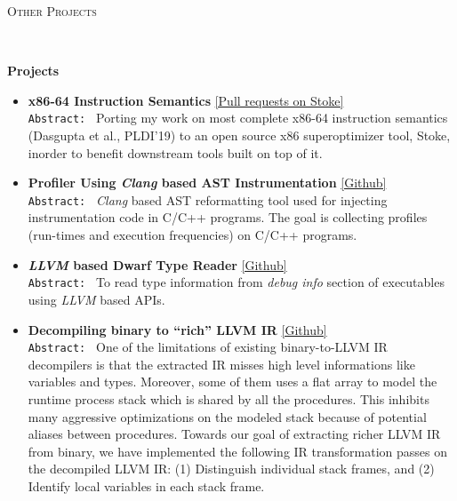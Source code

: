 \documentclass[9pt]{article}
\newenvironment{changemargin}[2]{%
  \begin{list}{}{%
    \setlength{\topsep}{0pt}%
    \setlength{\leftmargin}{#1}%
    \setlength{\rightmargin}{#2}%
    \setlength{\listparindent}{\parindent}%
    \setlength{\itemindent}{\parindent}%
    \setlength{\parsep}{\parskip}%
  }%
  \item[]}{\end{list}
}
\newcommand{\lineover}{
	\begin{changemargin}{-0.05in}{-0.05in}
		\vspace*{-8pt}
		\hrulefill \\
		\vspace*{-2pt}
	\end{changemargin}
}
\newcommand{\header}[1]{
	\begin{changemargin}{-0.5in}{-0.5in}
		\scshape{#1}\\
  	\lineover
	\end{changemargin}
}
\newenvironment{body} {
	\vspace*{-16pt}
	\begin{changemargin}{-0.25in}{-0.5in}
  }	
	{\end{changemargin}
}
\begin{document}
\smallskip

\header{Other Projects}

\begin{body}
	\vspace{14pt}
	\textbf{Projects}{} \hfill  \\
	\begin{itemize} \itemsep 3pt

           \item \textbf{x86-64 Instruction Semantics}
           \href{https://github.com/StanfordPL/stoke/pulls?q=is%3Apr+author%3Asdasgup3+is%3Aclosed}{[Pull requests on Stoke]} \\ 
           \texttt{Abstract: } Porting my work on most complete x86-64 instruction semantics (Dasgupta et al., PLDI'19) to an
open source x86 superoptimizer tool, Stoke, inorder to benefit downstream tools built on top of it.


           \item \textbf{Profiler Using \emph{Clang} based AST Instrumentation}
           \href{https://github.com/sdasgup3/profiler-using-clang-based-ast-instrumentation}{[Github]} \\ 
           \texttt{Abstract: } \emph{Clang} based AST reformatting tool used for
           injecting instrumentation code in C/C++ programs. The goal is
           collecting profiles (run-times and execution frequencies) on C/C++
           programs.

           \item \textbf{\emph{LLVM} based Dwarf Type Reader} 
           \href{https://github.com/sdasgup3/dwarf-type-reader}{[Github]} \\
             \texttt{Abstract: } To read type information from \emph{debug info}
             section of executables using \emph{LLVM} based APIs.

           \item \textbf{Decompiling binary to ``rich'' LLVM IR}
           \href{https://github.com/sdasgup3/binary-decompilation/blob/master/libs/stack_deconstructor/stack_deconstructor.cpp}{[Github]} \\ 

\texttt{Abstract: } One of the limitations of existing binary-to-LLVM IR
decompilers is that the extracted IR misses high level informations like
variables and types. Moreover, some of them uses a flat array to model the
runtime process stack which is shared by all the procedures. This inhibits many
aggressive optimizations on the modeled stack because of potential aliases
between procedures.  Towards our goal of extracting richer LLVM IR from binary,
        we have implemented the following IR transformation passes on the
        decompiled LLVM IR: (1) Distinguish individual stack frames, and (2)
        Identify local variables in each stack frame.


\end{itemize}
\end{body}
\end{document}

